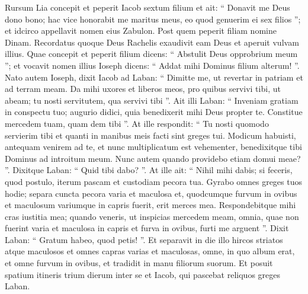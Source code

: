 \begin{biblechapter}
\begin{biblechapter}
\begin{biblechapter}
\begin{biblechapter}
\begin{biblechapter}
\begin{biblechapter}
\begin{biblechapter}
\begin{biblechapter}
\begin{biblechapter}
\begin{biblechapter}
\begin{biblechapter}
\begin{biblechapter}
\begin{biblechapter}
\begin{biblechapter}
\begin{biblechapter}
\begin{biblechapter}
\begin{biblechapter}
\begin{biblechapter}
\begin{biblechapter}
\begin{biblechapter}
\begin{biblechapter}
\begin{biblechapter}
\begin{biblechapter}
\begin{biblechapter}
\begin{biblechapter}
\begin{biblechapter}
\begin{biblechapter}
\begin{biblechapter}
\begin{biblechapter}
\begin{biblechapter}
 \verse Rursum Lia concepit et peperit Iacob sextum filium 
\verse et ait: “ Donavit me Deus dono bono; hac vice honorabit me maritus meus, eo quod genuerim ei sex filios ”; et idcirco appellavit nomen eius Zabulon.
 \verse Post quem peperit filiam nomine Dinam.
 \verse Recordatus quoque Deus Rachelis exaudivit eam Deus et aperuit vulvam illius. 
\verse Quae concepit et peperit filium dicens: “ Abstulit Deus opprobrium meum ”; 
\verse et vocavit nomen illius Ioseph dicens: “ Addat mihi Dominus filium alterum! ”.
 \verse Nato autem Ioseph, dixit Iacob ad Laban: “ Dimitte me, ut revertar in patriam et ad terram meam. 
\verse Da mihi uxores et liberos meos, pro quibus servivi tibi, ut abeam; tu nosti servitutem, qua servivi tibi ”. 
\verse Ait illi Laban: “ Inveniam gratiam in conspectu tuo; augurio didici, quia benedixerit mihi Deus propter te. 
\verse Constitue mercedem tuam, quam dem tibi ”.
 \verse At ille respondit: “ Tu nosti quomodo servierim tibi et quanti in manibus meis facti sint greges tui. 
\verse Modicum habuisti, antequam venirem ad te, et nunc multiplicatum est vehementer, benedixitque tibi Dominus ad introitum meum. Nunc autem quando providebo etiam domui meae? ”. 
\verse Dixitque Laban: “ Quid tibi dabo? ”. At ille ait: “ Nihil mihi dabis; si feceris, quod postulo, iterum pascam et custodiam pecora tua. 
\verse Gyrabo omnes greges tuos hodie; separa cuncta pecora varia et maculosa et, quodcumque furvum in ovibus et maculosum variumque in capris fuerit, erit merces mea. 
\verse Respondebitque mihi cras iustitia mea; quando veneris, ut inspicias mercedem meam, omnia, quae non fuerint varia et maculosa in capris et furva in ovibus, furti me arguent ”.
 \verse Dixit Laban: “ Gratum habeo, quod petis! ”. 
\verse Et separavit in die illo hircos striatos atque maculosos et omnes capras varias et maculosas, omne, in quo album erat, et omne furvum in ovibus, et tradidit in manu filiorum suorum. 
\verse Et posuit spatium itineris trium dierum inter se et Iacob, qui pascebat reliquos greges Laban.

\end{biblechapter}
\end{biblechapter}
\end{biblechapter}
\end{biblechapter}
\end{biblechapter}
\end{biblechapter}
\end{biblechapter}
\end{biblechapter}
\end{biblechapter}
\end{biblechapter}
\end{biblechapter}
\end{biblechapter}
\end{biblechapter}
\end{biblechapter}
\end{biblechapter}
\end{biblechapter}
\end{biblechapter}
\end{biblechapter}
\end{biblechapter}
\end{biblechapter}
\end{biblechapter}
\end{biblechapter}
\end{biblechapter}
\end{biblechapter}
\end{biblechapter}
\end{biblechapter}
\end{biblechapter}
\end{biblechapter}
\end{biblechapter}
\end{biblechapter}
